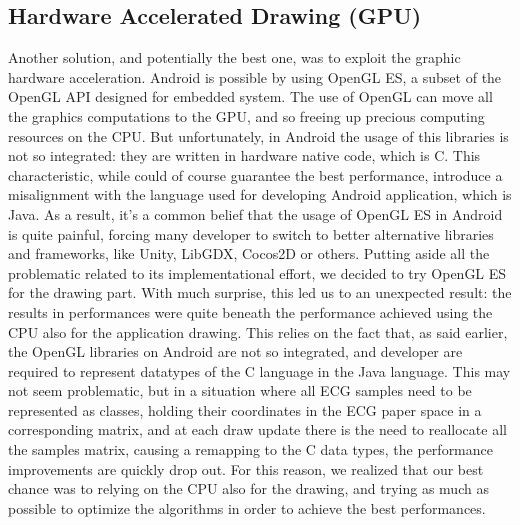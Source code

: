 \subsection{Hardware Accelerated Drawing (GPU)}
Another solution, and potentially the best one, was to exploit the graphic hardware acceleration. Android is possible by using OpenGL ES, a subset of the OpenGL API designed for embedded system. The use of OpenGL can move all the graphics computations to the GPU, and so freeing up precious computing resources on the CPU. But unfortunately, in Android the usage of this libraries is not so integrated: they are written in hardware native code, which is C. This characteristic, while could of course guarantee the best performance\cite{ref20}, introduce a misalignment with the language used for developing Android application, which is Java. As a result, it’s a common belief that the usage of OpenGL ES in Android is quite painful, forcing many developer to switch to better alternative libraries and frameworks, like Unity, LibGDX, Cocos2D or others. Putting aside all the problematic related to its implementational effort, we decided to try OpenGL ES for the drawing part. With much surprise, this led us to an unexpected result: the results in performances were quite beneath the performance achieved using the CPU also for the application drawing. This relies on the fact that, as said earlier, the OpenGL libraries on Android are not so integrated, and developer are required to represent datatypes of the C language in the Java language. This may not seem problematic, but in a situation where all ECG samples need to be represented as classes, holding their coordinates in the ECG paper space in a corresponding matrix, and at each draw update there is the need to reallocate all the samples matrix, causing a remapping to the C data types, the performance improvements  are quickly drop out. For this reason, we realized that our best chance was to relying on the CPU also for the drawing, and trying as much as possible to optimize the algorithms in order to achieve the best performances.

